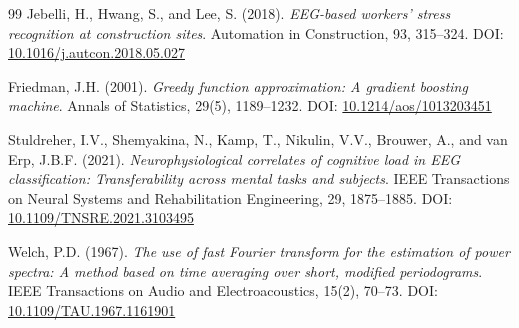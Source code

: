 \documentclass[12pt,a4paper]{article}
\begin{document}
\begin{thebibliography}{99}
		Jebelli, H., Hwang, S., and Lee, S. (2018).
		\textit{EEG-based workers' stress recognition at construction sites}.
		Automation in Construction, 93, 315--324.
		DOI: \href{https://doi.org/10.1016/j.autcon.2018.05.027}{10.1016/j.autcon.2018.05.027}

		Friedman, J.H. (2001).
		\textit{Greedy function approximation: A gradient boosting machine}.
		Annals of Statistics, 29(5), 1189--1232.
		DOI: \href{https://doi.org/10.1214/aos/1013203451}{10.1214/aos/1013203451}

		Stuldreher, I.V., Shemyakina, N., Kamp, T., Nikulin, V.V., Brouwer, A., and van Erp, J.B.F. (2021).
		\textit{Neurophysiological correlates of cognitive load in EEG classification: Transferability across mental tasks and subjects}.
		IEEE Transactions on Neural Systems and Rehabilitation Engineering, 29, 1875--1885.
		DOI: \href{https://doi.org/10.1109/TNSRE.2021.3103495}{10.1109/TNSRE.2021.3103495}

		Welch, P.D. (1967).
		\textit{The use of fast Fourier transform for the estimation of power spectra: A method based on time averaging over short, modified periodograms}.
		IEEE Transactions on Audio and Electroacoustics, 15(2), 70--73.
		DOI: \href{https://doi.org/10.1109/TAU.1967.1161901}{10.1109/TAU.1967.1161901}

	\end{thebibliography}
	
\end{document}
